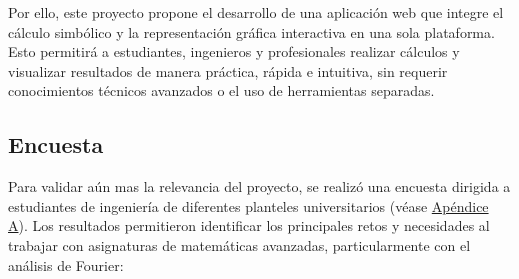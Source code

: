 Por ello, este proyecto propone el desarrollo de una aplicación web que integre el cálculo simbólico y la representación gráfica interactiva en una sola plataforma. Esto permitirá a estudiantes, ingenieros y profesionales realizar cálculos y visualizar resultados de manera práctica, rápida e intuitiva, sin requerir conocimientos técnicos avanzados o el uso de herramientas separadas. 

\subsection{Encuesta}
Para validar aún mas la relevancia del proyecto, se realizó una encuesta dirigida a estudiantes de ingeniería de diferentes planteles universitarios (véase \hyperref[app1:Encuesta]{Apéndice A}). Los resultados permitieron identificar los principales retos y necesidades al trabajar con asignaturas de matemáticas avanzadas, particularmente con el análisis de Fourier:


